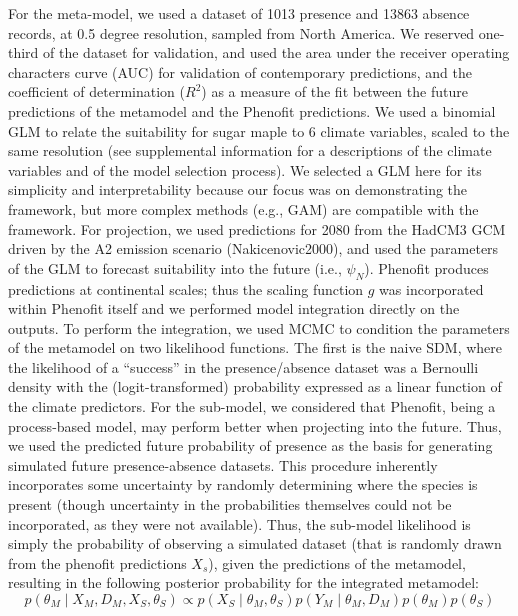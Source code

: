 For the meta-model, we used a dataset of 1013 presence and 13863 absence records, at 0.5 degree resolution, sampled from North America.
We reserved one-third of the dataset for validation, and used the area under the receiver operating characters curve (AUC) for validation of contemporary predictions, and the coefficient of determination (\(R^2\)) as a measure of the fit between the future predictions of the metamodel and the Phenofit predictions.
We used a binomial GLM to relate the suitability for sugar maple to 6 climate variables, scaled to the same resolution (see supplemental information for a descriptions of the climate variables and of the model selection process).
We selected a GLM here for its simplicity and interpretability because our focus was on demonstrating the framework, but more complex methods (e.g., GAM) are compatible with the framework.
For projection, we used predictions for 2080 from the HadCM3 GCM \citep{Pope2000} driven by the A2 emission scenario (Nakicenovic2000), and used the parameters of the GLM to forecast suitability into the future (i.e., \(\psi_N\)).
Phenofit produces predictions at continental scales; thus the scaling function \(g\) was incorporated within Phenofit itself and we performed model integration directly on the outputs.
To perform the integration, we used \ac{MCMC} to condition the parameters of the metamodel  on two likelihood functions.
The first is the naive SDM, where the likelihood of a ``success'' in the presence/absence dataset was a Bernoulli density with the (logit-transformed) probability expressed as a linear function of the climate predictors.
For the sub-model, we considered that Phenofit, being a process-based model, may perform better when projecting into the future.
Thus, we used the predicted future probability of presence as the basis for generating simulated future presence-absence datasets.
This procedure inherently incorporates some uncertainty by randomly determining where the species is present (though uncertainty in the probabilities themselves could not be incorporated, as they were not available).
Thus, the sub-model likelihood is simply the probability of observing a simulated dataset (that is randomly drawn from the phenofit predictions \(X_s\)),  given the predictions of the metamodel, resulting in the following posterior probability for the integrated metamodel:
\begin{equation}
\label{eq:integrated2}
	p( \theta_M \mid X_M, D_M, X_S, \theta_S )
	\propto 
	p( X_S \mid \theta_M, \theta_S )
	p( Y_M \mid \theta_M, D_M ) 
	p( \theta_M )
	p( \theta_S )
\end{equation}

